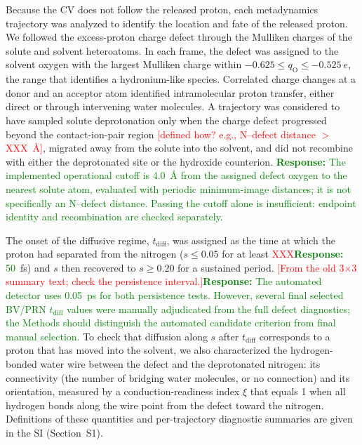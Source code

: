 Because the CV does not follow the released proton, each metadynamics trajectory was analyzed to identify the location and fate of the released proton.
We followed the excess-proton charge defect through the Mulliken charges of the solute and solvent heteroatoms.
In each frame, the defect was assigned to the solvent oxygen with the largest Mulliken charge within $-0.625\leq q_{\mathrm O}\leq-0.525\ e$, the range that identifies a hydronium-like species.
Correlated charge changes at a donor and an acceptor atom identified intramolecular proton transfer, either direct or through intervening water molecules.
A trajectory was considered to have sampled solute deprotonation only when the charge defect progressed beyond the contact-ion-pair region \textcolor{red}{[defined how? e.g., N--defect distance $>$ XXX~\AA{}]}, migrated away from the solute into the solvent, and did not recombine with either the deprotonated site or the hydroxide counterion.
\textcolor{green}{\textbf{Response:} The implemented operational cutoff is 4.0~\AA{} from the assigned defect oxygen to the nearest solute atom, evaluated with periodic minimum-image distances; it is not specifically an N--defect distance. Passing the cutoff alone is insufficient: endpoint identity and recombination are checked separately.}

The onset of the diffusive regime, $t_{\mathrm{diff}}$, was assigned as the time at which the proton had separated from the nitrogen ($s\leq0.05$ for at least \textcolor{red}{XXX}\textcolor{green}{\textbf{Response:} 50}~fs) and $s$ then recovered to $s\geq0.20$ for a sustained period. \textcolor{red}{[From the old 3$\times$3 summary text; check the persistence interval.]}\textcolor{green}{\textbf{Response:} The automated detector uses 0.05~ps for both persistence tests. However, several final selected BV/PRN $t_{\mathrm{diff}}$ values were manually adjudicated from the full defect diagnostics; the Methods should distinguish the automated candidate criterion from final manual selection.}
To check that diffusion along $s$ after $t_{\mathrm{diff}}$ corresponds to a proton that has moved into the solvent, we also characterized the hydrogen-bonded water wire between the defect and the deprotonated nitrogen: its connectivity (the number of bridging water molecules, or no connection) and its orientation, measured by a conduction-readiness index $\xi$ that equals 1 when all hydrogen bonds along the wire point from the defect toward the nitrogen.
Definitions of these quantities and per-trajectory diagnostic summaries are given in the SI (Section~S1).

